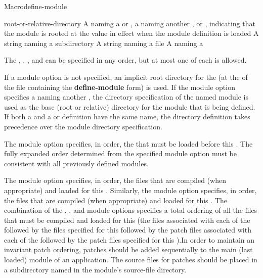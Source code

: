 \documentclass[10pt,twoside,english,pdftex]{article}
\begin{document}
\begin{functiondoc}{Macro}{define-module}{\superstar}
\fnterms
\begin{args}{root-or-relative-directory}
 A  naming a  or
  , a  naming another , or
  \nil{}, indicating that the module is rooted at the 
  value in effect when the module definition is loaded
\arg[subdirectory] A string naming a subdirectory
 A string naming a file
 A  naming a 
\end{args}

\fndescription The  , ,
, and  can be specified in any order, but at most
one of each is allowed.

If a  module option is not specified, an implicit root
directory for the  (at the  of the file
containing the \textbf{define-module} form) is used.  If the 
module option specifies a  naming another , the
directory specification of the named module is used as the base (root or
relative) directory for the module that is being defined.  If both a
 and a  or  definition
have the same name, the directory definition takes precedence over the module
directory specification.

The  module option specifies, in order, the 
that must be loaded before this .  The fully expanded
 order determined from the specified 
module option must be consistent with all previously defined modules.

The  module option specifies, in order, the files that are
compiled (when appropriate) and loaded for this .  Similarly,
the  module option specifies, in order, the  files
that are compiled (when appropriate) and loaded for this .  The
combination of the , , and  module
options specifies a total ordering of all the files that must be compiled and
loaded for this  (the files associated with each of the
 followed by the files specified for this
 followed by the patch files associated with each of the
 followed by the patch files specified for this
).In order to maintain an invariant patch ordering, patches
should be added sequentially to the main (last loaded) module of an
application. The source files for patches should be placed in a subdirectory
named  in the module's source-file directory.


\end{functiondoc}
\end{document}
